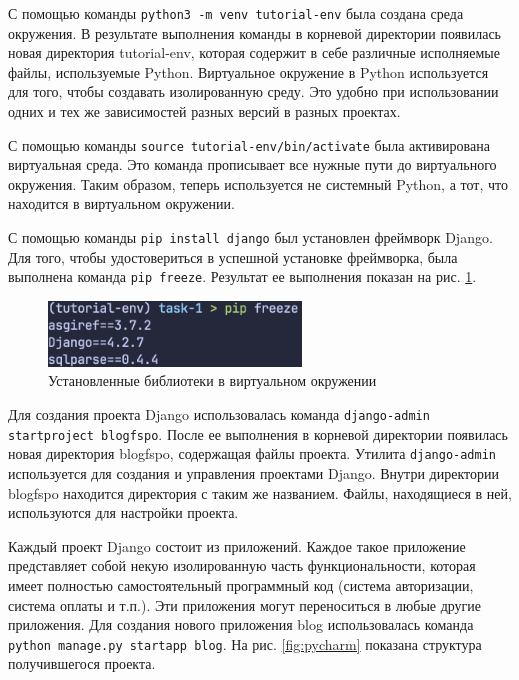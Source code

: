 \documentclass[a4paper, 14pt]{extarticle}
\begin{document}
С помощью команды \texttt{python3 -m venv tutorial-env} была создана среда
окружения. В результате выполнения команды в корневой директории появилась новая
директория tutorial-env, которая содержит в себе различные исполняемые файлы,
используемые Python. Виртуальное окружение в Python используется для того, чтобы
создавать изолированную среду. Это удобно при использовании одних и тех же
зависимостей разных версий в разных проектах.

С помощью команды \texttt{source tutorial-env/bin/activate} была активирована
виртуальная среда. Это команда прописывает все нужные пути до виртуального
окружения. Таким образом, теперь используется не системный Python, а тот, что
находится в виртуальном окружении.

С помощью команды \texttt{pip install django} был установлен фреймворк Django.
Для того, чтобы удостовериться в успешной установке фреймворка, была выполнена
команда \texttt{pip freeze}. Результат ее выполнения показан на рис.
\ref{fig:pip-freeze}.

\begin{figure}[H]
  \centering
  \includegraphics[width=0.6\textwidth]{images/pip-freeze.png}
  \caption{Установленные библиотеки в виртуальном окружении}
  \label{fig:pip-freeze}
\end{figure}

Для создания проекта Django использовалась команда \texttt{django-admin
  startproject blogfspo}. После ее выполнения в корневой директории появилась
новая директория blogfspo, содержащая файлы проекта. Утилита
\texttt{django-admin} используется для создания и управления проектами Django.
Внутри директории blogfspo находится директория с таким же названием. Файлы,
находящиеся в ней, используются для настройки проекта.

Каждый проект Django состоит из приложений. Каждое такое приложение представляет
собой некую изолированную часть функциональности, которая имеет полностью
самостоятельный программный код (система авторизации, система оплаты и т.п.).
Эти приложения могут переноситься в любые другие приложения. Для создания нового
приложения blog использовалась команда \texttt{python manage.py startapp blog}.
На рис. \ref{fig:pycharm} показана структура получившегося проекта.
\end{document}

